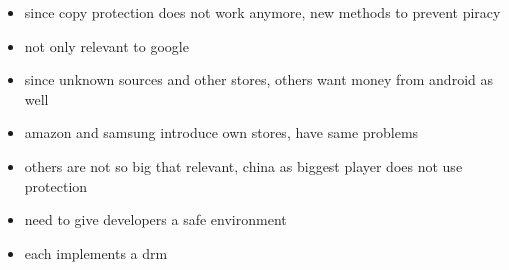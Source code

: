 \begin{itemize}
    \item since copy protection does not work anymore, new methods to prevent piracy
    \item not only relevant to google
    \item since unknown sources and other stores, others want money from android as well
    \item amazon and samsung introduce own stores, have same problems
    \item others are not so big that relevant, china as biggest player does not use protection
    \item need to give developers a safe environment
    \item each implements a drm
\end{itemize}
